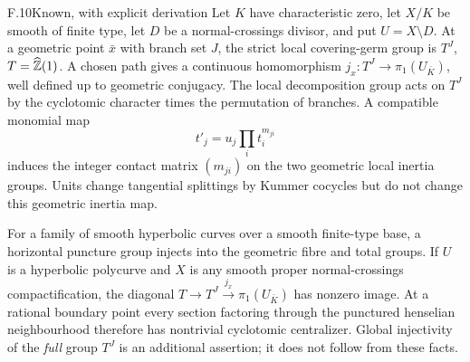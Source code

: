 \begin{claim}{F.10}{Known, with explicit derivation}
Let $K$ have characteristic zero, let $X/K$ be smooth of finite type,
let $D$ be a normal-crossings divisor, and put $U=X\setminus D$.
At a geometric point $\bar x$ with branch set $J$, the strict local
covering-germ group is $T^J$, $T=\widehat{\mathbb Z}(1)$. A chosen path
gives a continuous homomorphism
$j_x:T^J\to\pi_1(U_{\bar K})$, well defined up to geometric
conjugacy. The local decomposition group acts on $T^J$ by the
cyclotomic character times the permutation of branches. A compatible
monomial map
\[
 t'_j=u_j\prod_i t_i^{m_{ji}}
\]
induces the integer contact matrix $(m_{ji})$ on the two geometric
local inertia groups. Units change tangential splittings by Kummer
cocycles but do not change this geometric inertia map.

For a family of smooth hyperbolic curves over a smooth finite-type
base, a horizontal puncture group injects into the geometric fibre
and total groups. If $U$ is a hyperbolic polycurve and $X$ is any
smooth proper normal-crossings compactification, the diagonal
$T\to T^J\xrightarrow{j_x}\pi_1(U_{\bar K})$ has nonzero
image. At a rational boundary point every section factoring through
the punctured henselian neighbourhood therefore has nontrivial
cyclotomic centralizer. Global injectivity of the \emph{full} group
$T^J$ is an additional assertion; it does not follow from these facts.
\end{claim}

